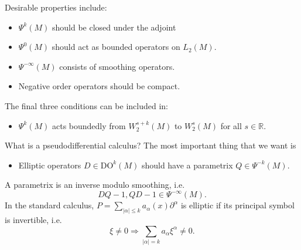 \documentclass{beamer}
\numberwithin{equation}{section}
\theoremstyle{plain}
\theoremstyle{plain}
\theoremstyle{definition}
\theoremstyle{plain}
\theoremstyle{plain}
\theoremstyle{definition}
\newcommand{\Rl}{\mathbb{R}}
\begin{document}
\begin{frame}
  Desirable properties include:
  \begin{itemize}
    \item{} $\Psi^k(M)$ should be closed under the adjoint
    \item{} $\Psi^0(M)$ should act as bounded operators on $L_2(M).$
    \item{} $\Psi^{-\infty}(M)$ consists of smoothing operators.
    \item{} Negative order operators should be compact.
  \end{itemize}\pause
  The final three conditions can be included in:
  \begin{itemize}
    \item{} $\Psi^k(M)$ acts boundedly from $W^{s+k}_2(M)$ to $W^{s}_2(M)$ for all $s\in \Rl.$
  \end{itemize}
\end{frame}

\begin{frame}{What is a pseudodifferential calculus?}
  The most important thing that we want is 
  \begin{itemize}
    \item{} Elliptic operators $D\in \mathrm{DO}^k(M)$ should have a parametrix $Q \in \Psi^{-k}(M).$
  \end{itemize}
  A parametrix is an inverse modulo smoothing, i.e.
  \[
    DQ-1,QD-1 \in \Psi^{-\infty}(M).
  \]
  \pause
  In the standard calculus, $P=\sum_{|\alpha|\leq k} a_{\alpha}(x)\partial^{\alpha}$ is elliptic if its principal symbol is invertible, i.e.
  \[
    \xi\neq 0\Rightarrow \sum_{|\alpha|=k} a_{\alpha}\xi^{\alpha} \neq 0.
  \]
\end{frame}
\end{document}
